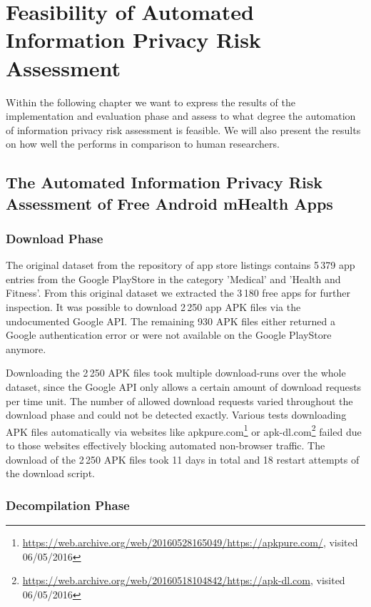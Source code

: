 \section{Feasibility of Automated Information Privacy Risk Assessment}

Within the following chapter we want to express the results of the implementation and evaluation phase and assess to what degree the automation of information privacy risk assessment is feasible.
We will also present the results on how well the \aiprat performs in comparison to human researchers.

\subsection{The Automated Information Privacy Risk Assessment of Free Android mHealth Apps}

\subsubsection{Download Phase}

The original dataset from the \cite{Xu2015} repository of app store listings contains 5\,379 app entries from the Google PlayStore in the category 'Medical' and 'Health and Fitness'.
From this original dataset we extracted the 3\,180 free apps for further inspection.
It was possible to download 2\,250 app APK files via the undocumented Google API.
The remaining 930 APK files either returned a Google authentication error or were not available on the Google PlayStore anymore.

Downloading the 2\,250 APK files took multiple download-runs over the whole dataset, since the Google API only allows a certain amount of download requests per time unit.
The number of allowed download requests varied throughout the download phase and could not be detected exactly.
Various tests downloading APK files automatically via websites like apkpure.com\footnote{\url{https://web.archive.org/web/20160528165049/https://apkpure.com/}, visited 06/05/2016} or apk-dl.com\footnote{\url{https://web.archive.org/web/20160518104842/https://apk-dl.com}, visited 06/05/2016} failed due to those websites effectively blocking automated non-browser traffic.
The download of the 2\,250 APK files took 11 days in total and 18 restart attempts of the download script.

\subsubsection{Decompilation Phase}

